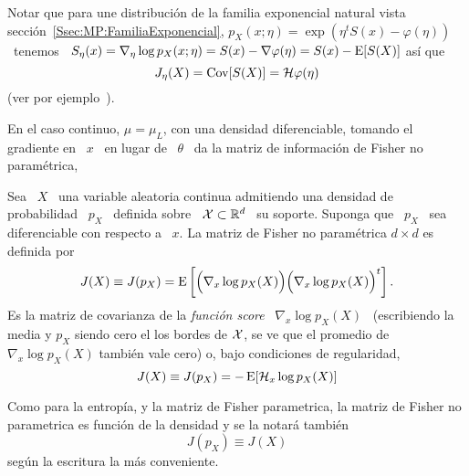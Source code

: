 Notar  que para  une  distribuci\'on  de la  familia  exponencial natural  vista
secci\'on~\ref{Ssec:MP:FamiliaExponencial},  $p_X(x;\eta)  =  \exp\left(  \eta^t
  S(x)  - \varphi(\eta)  \right)$  \  tenemos \  $S_\eta(x)  = \nabla_\eta  \log
p_X(x;\eta) = S(x) - \nabla \varphi(\eta) = S(x) - \operatorname{E}[S(X)]$ as\'i que
%
\[
J_\eta(X) = \operatorname{Cov}[S(X)] = \mathcal{H} \varphi(\eta)
\]
%
(ver por ejemplo~\cite{LehCas98, Bos07}).

En el caso  continuo, $\mu = \mu_L$, con una  densidad diferenciable, tomando el
gradiente en \ $x$  \ en lugar de \ $\theta$ \ da  la matriz de informaci\'on de
Fisher no param\'etrica,
%
\begin{definicion}
\label{Def:SZ:MatrizFisherNoParametrica}
%
  Sea  \ $X$  \  una  variable aleatoria  continua  admitiendo  una densidad  de
  probabilidad \  $p_X$ \ definida  sobre \ $\mathcal{X}  \subset \mathbb{R}^d$ \  su soporte.
  Suponga que \  $p_X$ \ sea diferenciable  con respecto a \ $x$.   La matriz de
  Fisher no param\'etrica $d \times d$ es definida por
  \[
  J(X) \equiv J(p_X) =  \operatorname{E}\left[ \Big(  \nabla_x \log p_X(X)  \Big) \Big(  \nabla_x \log
      p_X(X) \Big)^t \right].
  \]
  Es  la matriz  de covarianza  de  la {\it  funci\'on score}  \ $\nabla_x  \log
  p_X(X)$ \ (escribiendo la media y $p_X$  siendo cero el los bordes de $\mathcal{X}$, se
  ve que  el promedio  de $\nabla_x  \log p_X(X)$ tambi\'en  vale cero)  o, bajo
  condiciones de regularidad,
  \[
  J(X) \equiv J(p_X) = - \operatorname{E}[\mathcal{H}_x \log p_X(X)]
  \]
\end{definicion}
%
Como para la entrop\'ia, y la matriz  de Fisher parametrica, la matriz de Fisher
no parametrica es funci\'on de la densidad y se la notar\'a tambi\'en
%
\[
J(p_X) \equiv J(X)
\]
%
seg\'un la escritura la m\'as conveniente.


